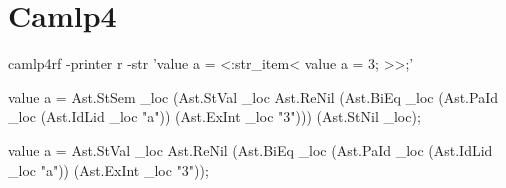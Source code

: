 \section{Camlp4}


\begin{bashcode}
camlp4rf -printer r -str 'value a = <:str_item< value a = 3; >>;'
\end{bashcode}

\begin{ocamlcode}
value a =
  Ast.StSem _loc
    (Ast.StVal _loc Ast.ReNil
       (Ast.BiEq _loc (Ast.PaId _loc (Ast.IdLid _loc "a"))
          (Ast.ExInt _loc "3")))
    (Ast.StNil _loc);
\end{ocamlcode}

\begin{ocamlcode}
value a =
  Ast.StVal _loc Ast.ReNil
    (Ast.BiEq _loc (Ast.PaId _loc (Ast.IdLid _loc "a")) (Ast.ExInt _loc "3"));
\end{ocamlcode}
